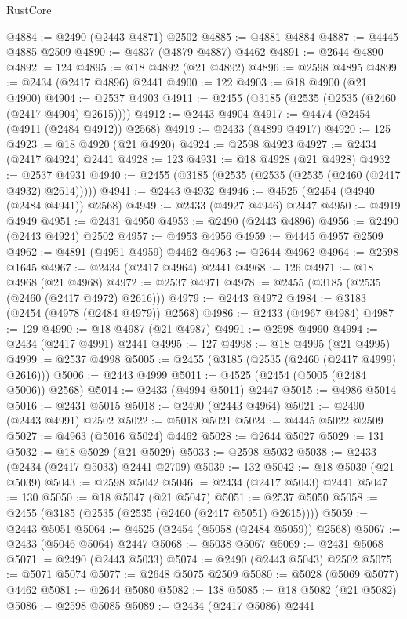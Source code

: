 \begin{lexlean}{RustCore}
\begin{coremodule}
@4884 := @2490 (@2443 @4871) @2502
@4885 := @4881 @4884
@4887 := @4445 @4885 @2509
@4890 := @4837 (@4879 @4887) @4462
@4891 := @2644 @4890
@4892 := 124
@4895 := @18 @4892 (@21 @4892)
@4896 := @2598 @4895
@4899 := @2434 (@2417 @4896) @2441
@4900 := 122
@4903 := @18 @4900 (@21 @4900)
@4904 := @2537 @4903
@4911 := @2455 (@3185 (@2535 (@2535 (@2460 (@2417 @4904) @2615))))
@4912 := @2443 @4904
@4917 := @4474 (@2454 (@4911 (@2484 @4912)) @2568)
@4919 := @2433 (@4899 @4917)
@4920 := 125
@4923 := @18 @4920 (@21 @4920)
@4924 := @2598 @4923
@4927 := @2434 (@2417 @4924) @2441
@4928 := 123
@4931 := @18 @4928 (@21 @4928)
@4932 := @2537 @4931
@4940 := @2455 (@3185 (@2535 (@2535 (@2535 (@2460 (@2417 @4932) @2614)))))
@4941 := @2443 @4932
@4946 := @4525 (@2454 (@4940 (@2484 @4941)) @2568)
@4949 := @2433 (@4927 @4946) @2447
@4950 := @4919 @4949
@4951 := @2431 @4950
@4953 := @2490 (@2443 @4896)
@4956 := @2490 (@2443 @4924) @2502
@4957 := @4953 @4956
@4959 := @4445 @4957 @2509
@4962 := @4891 (@4951 @4959) @4462
@4963 := @2644 @4962
@4964 := @2598 @1645
@4967 := @2434 (@2417 @4964) @2441
@4968 := 126
@4971 := @18 @4968 (@21 @4968)
@4972 := @2537 @4971
@4978 := @2455 (@3185 (@2535 (@2460 (@2417 @4972) @2616)))
@4979 := @2443 @4972
@4984 := @3183 (@2454 (@4978 (@2484 @4979)) @2568)
@4986 := @2433 (@4967 @4984)
@4987 := 129
@4990 := @18 @4987 (@21 @4987)
@4991 := @2598 @4990
@4994 := @2434 (@2417 @4991) @2441
@4995 := 127
@4998 := @18 @4995 (@21 @4995)
@4999 := @2537 @4998
@5005 := @2455 (@3185 (@2535 (@2460 (@2417 @4999) @2616)))
@5006 := @2443 @4999
@5011 := @4525 (@2454 (@5005 (@2484 @5006)) @2568)
@5014 := @2433 (@4994 @5011) @2447
@5015 := @4986 @5014
@5016 := @2431 @5015
@5018 := @2490 (@2443 @4964)
@5021 := @2490 (@2443 @4991) @2502
@5022 := @5018 @5021
@5024 := @4445 @5022 @2509
@5027 := @4963 (@5016 @5024) @4462
@5028 := @2644 @5027
@5029 := 131
@5032 := @18 @5029 (@21 @5029)
@5033 := @2598 @5032
@5038 := @2433 (@2434 (@2417 @5033) @2441 @2709)
@5039 := 132
@5042 := @18 @5039 (@21 @5039)
@5043 := @2598 @5042
@5046 := @2434 (@2417 @5043) @2441
@5047 := 130
@5050 := @18 @5047 (@21 @5047)
@5051 := @2537 @5050
@5058 := @2455 (@3185 (@2535 (@2535 (@2460 (@2417 @5051) @2615))))
@5059 := @2443 @5051
@5064 := @4525 (@2454 (@5058 (@2484 @5059)) @2568)
@5067 := @2433 (@5046 @5064) @2447
@5068 := @5038 @5067
@5069 := @2431 @5068
@5071 := @2490 (@2443 @5033)
@5074 := @2490 (@2443 @5043) @2502
@5075 := @5071 @5074
@5077 := @2648 @5075 @2509
@5080 := @5028 (@5069 @5077) @4462
@5081 := @2644 @5080
@5082 := 138
@5085 := @18 @5082 (@21 @5082)
@5086 := @2598 @5085
@5089 := @2434 (@2417 @5086) @2441

\end{coremodule}
\end{lexlean}
